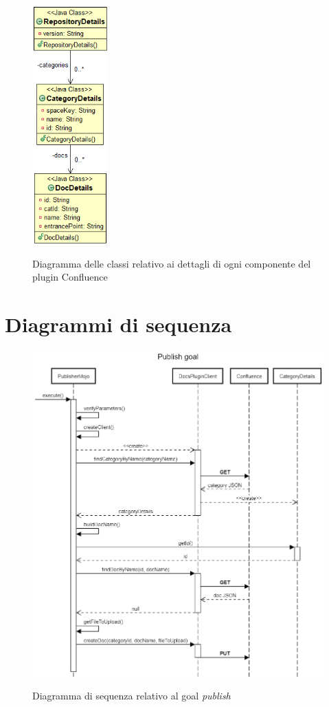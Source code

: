 \begin{figure}[H]
    \centering
    \includegraphics[width=0.26\textwidth]{immagini/details.png}\\
    \caption{Diagramma delle classi relativo ai dettagli di ogni componente del plugin Confluence}
\end{figure}

\section{Diagrammi di sequenza}
\label{sec:diagrammi-sequenza}

\begin{figure}[H]
    \centering
    \includegraphics[width=\textwidth]{immagini/CreateDocSequence.png}\\
    \caption{Diagramma di sequenza relativo al goal \emph{publish}}
\end{figure}

